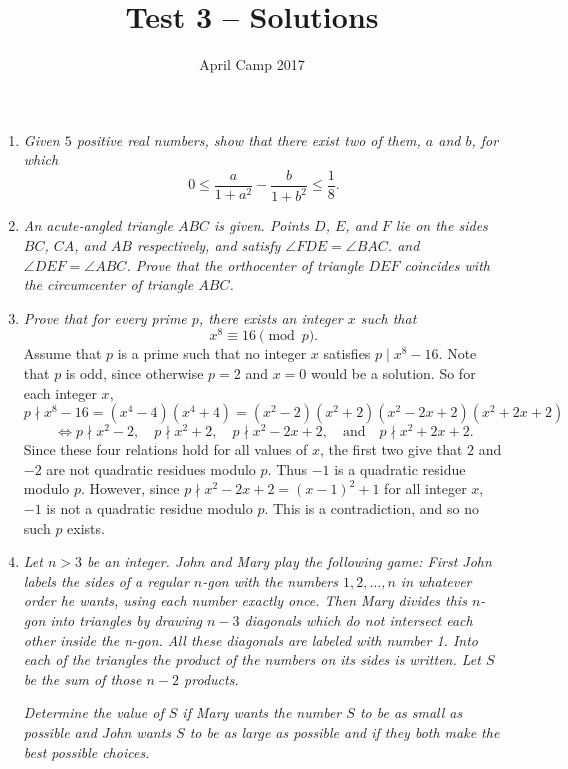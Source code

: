 \documentclass[a4paper,12pt]{article}
\author{April Camp 2017}
\title{Test 3 -- Solutions}
\date{}
\begin{document}
 \maketitle

\begin{enumerate}
	\item 
	\textit{Given $5$ positive real numbers, show that there exist two of them,
	$a$ and $b$, for which \[0 \leq \frac{a}{1+a^2} - \frac{b}{1+b^2} \leq \frac{1}{8}.\]}
	
	
		
	\item 
	\textit{An acute-angled triangle $ABC$ is given. Points $D$, $E$, and $F$ lie
	on the sides $BC$, $CA$, and $AB$ respectively, and satisfy $\angle
	FDE = \angle BAC$. and $\angle DEF = \angle ABC$. Prove that the
	orthocenter of triangle $DEF$ coincides with the circumcenter of
	triangle $ABC$.}
	
	
	
	\item
	\textit{Prove that for every prime $p$, there exists an integer $x$ such that \[x^8 \equiv 16 \pmod p.\]}
	Assume that $p$ is a prime such that no integer $x$ satisfies $p \mid x^8-16$. Note that $p$ is odd, since otherwise $p=2$ and $x=0$ would be a solution. So for each integer $x$, \[p \nmid x^8-16 = (x^4-4)(x^4+4) = (x^2-2)(x^2+2) (x^2-2x+2)(x^2+2x+2)\] \[\iff p \nmid x^2-2,\quad p \nmid x^2+2,\quad p \nmid x^2-2x+2,\quad \text{and} \quad p \nmid x^2+2x+2.\]
	Since these four relations hold for all values of $x$, the first two give that $2$ and $-2$ are not quadratic residues modulo $p$. Thus $-1$ is a quadratic residue modulo $p$. However, since $p \nmid x^2-2x+2 = (x-1)^2+1$ for all integer $x$, $-1$ is not a quadratic residue modulo $p$. This is a contradiction, and so no such $p$ exists.
	
	\item 
	\textit{Let $n > 3$ be an integer. John and Mary play the following game: First John labels the sides of a regular $n$-gon with the numbers $1, 2, \dotsc, n$ in whatever order he wants, using each number exactly once. Then Mary divides this $n$-gon into triangles by drawing $n − 3$ diagonals which do not intersect each other inside the n-gon. All these diagonals are labeled with number 1. Into each of the triangles the product of the numbers on its sides is written. Let $S$ be the sum of those $n − 2$ products.}
	
	\textit{Determine the value of $S$ if Mary wants the number $S$ to be as small as possible and John wants $S$ to be as large as possible and if they both make the best possible choices.}
	
	

\end{enumerate}
\end{document}
